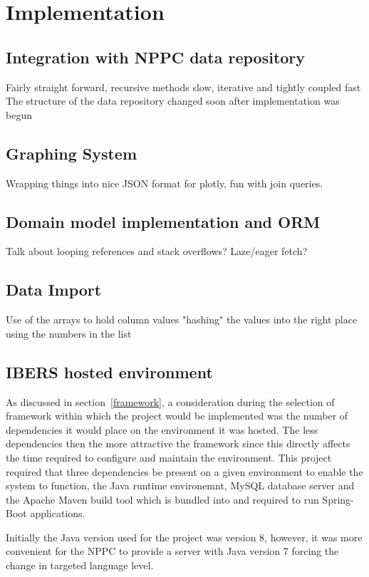 \chapter{Implementation}



\section{Integration with NPPC data repository}
Fairly straight forward, recursive methods slow, iterative and tightly coupled fast
The structure of the data repository changed soon after implementation was begun
\section{Graphing System}
Wrapping things into nice JSON format for plotly, fun with join queries.

\section{Domain model implementation and ORM}
Talk about looping references and stack overflows? Laze/eager fetch? 

\section{Data Import}
Use of the arrays to hold column values "hashing" the values into the right place using the numbers in the list

\section{IBERS hosted environment}

As discussed in section~\ref{framework}, a consideration during the selection of framework within which the project would be implemented was the number of dependencies it would place on the environment it was hosted. The less dependencies then the more attractive the framework since this directly affects the time required to configure and maintain the environment. This project required that three dependencies be present on a given environment to enable the system to function, the Java runtime environemnt, MySQL database server and the Apache Maven build tool which is bundled into and required to run Spring-Boot applications. 

Initially the Java version used for the project was version 8, however, it was more convenient for the NPPC to provide a server with Java version 7 forcing the change in targeted language level.


